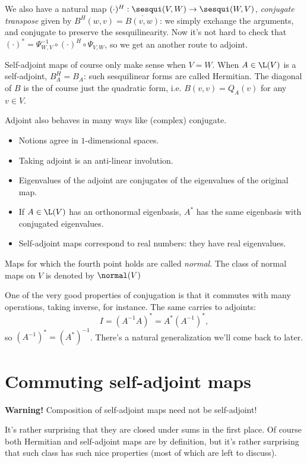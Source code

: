 We also have a natural map $(\cdot)^{H} : \sesqui(V, W) \to \sesqui(W, V)$, \textit{conjugate transpose} given by $B^{H}(w, v) = \overline{B(v, w)}$: we simply exchange the arguments, and conjugate to preserve the sesquilinearity. Now it's not hard to check that $(\cdot)^{*} = \Psi^{-1}_{W, V} \circ (\cdot)^{H} \circ \Psi_{V, W}$, so we get an another route to adjoint.

Self-adjoint maps of course only make sense when $V = W$. When $A \in \L(V)$ is a self-adjoint, $B_{A}^{H} = B_{A}$: such sesquilinear forms are called Hermitian. The diagonal of $B$ is the of course just the quadratic form, i.e. $B(v, v) = Q_{A}(v)$ for any $v \in V$.

Adjoint also behaves in many ways like (complex) conjugate.
\begin{itemize}
	\item Notions agree in $1$-dimensional spaces.
	\item Taking adjoint is an anti-linear involution.
	\item Eigenvalues of the adjoint are conjugates of the eigenvalues of the original map.
	\item If $A \in \L(V)$ has an orthonormal eigenbasis, $A^{*}$ has the same eigenbasis with conjugated eigenvalues.
	\item Self-adjoint maps correspond to real numbers: they have real eigenvalues.
\end{itemize}

Maps for which the fourth point holds are called \textit{normal}. The class of normal maps on $V$ is denoted by $\normal(V)$

One of the very good properties of conjugation is that it commutes with many operations, taking inverse, for instance. The same carries to adjoints:
\[
	I = (A^{-1}A)^{*} = A^{*} (A^{-1})^{*},
\]
so $(A^{-1})^{*} = (A^{*})^{-1}$. There's a natural generalization we'll come back to later.

\section{Commuting self-adjoint maps}

\textbf{Warning!} Composition of self-adjoint maps need not be self-adjoint!

It's rather surprising that they are closed under sums in the first place. Of course both Hermitian and self-adjoint maps are by definition, but it's rather surprising that such class has such nice properties (most of which are left to discuss).

